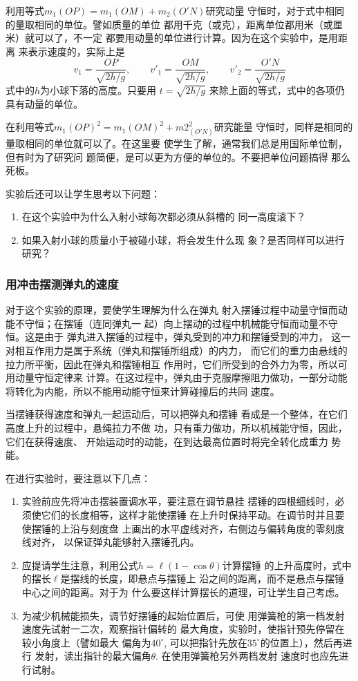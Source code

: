 利用等式$m_1(OP)=m_1(OM)+m_2(O'N)$研究动量
守恒时，对于式中相同的量取相同的单位。譬如质量的单位
都用千克（或克），距离单位都用米（或厘米）就可以了，不一定
都要用动量的单位进行计算。因为在这个实验中，是用距离
来表示速度的，实际上是
\[v_1=\frac{OP}{\sqrt{2h/g}},\qquad v'_1=\frac{OM}{\sqrt{2h/g}},\qquad v'_2=\frac{O'N}{\sqrt{2h/g}}\]
式中的$h$为小球下落的高度。只要用
$t=\sqrt{2h/g}$
来除上面的等式，式中的各项仍具有动量的单位。

在利用等式$m_1(OP)^2=m_1(OM)^2+m2_(O'N)^2$研究能量
守恒时，同样是相同的量取相同的单位就可以了。在这里要
使学生了解，通常我们总是用国际单位制，但有时为了研究问
题简便，是可以更为方便的单位的。不要把单位问题搞得
那么死板。

实验后还可以让学生思考以下问题：
\begin{enumerate}
\item 在这个实验中为什么入射小球每次都必须从斜槽的
同一高度滚下？
\item 如果入射小球的质量小于被碰小球，将会发生什么现
象？是否同样可以进行研究？
\end{enumerate}

\subsubsection{用冲击摆测弹丸的速度}

对于这个实验的原理，要使学生理解为什么在弹丸
射入摆锤过程中动量守恒而动能不守恒；在摆锤（连同弹丸一
起）向上摆动的过程中机械能守恒而动量不守恒。这是由于
弹丸进入摆锤的过程中，弹丸受到的冲力和摆锤受到的冲力，
这一对相互作用力是属于系统（弹丸和摆锤所组成）的内力，
而它们的重力由悬线的拉力所平衡，因此在弹丸和摆锤相互
作用时，它们所受到的合外力为零，所以可用动量守恒定律来
计算。在这过程中，弹丸由于克服摩擦阻力做功，一部分动能
将转化为内能，所以不能用动能守恒来计算碰撞后的共同
速度。

当摆锤获得速度和弹丸一起运动后，可以把弹丸和摆锤
看成是一个整体，在它们高度上升的过程中，悬绳拉力不做
功，只有重力做功，所以机械能守恒，因此，它们在获得速度、
开始运动时的动能，在到达最高位置时将完全转化成重力
势能。

在进行实验时，要注意以下几点：
\begin{enumerate}
\item 实验前应先将冲击摆装置调水平，要注意在调节悬挂
摆锤的四根细线时，必须使它们的长度相等，这样才能使摆锤
在上升时保持平动。在调节时并且要使摆锤的上沿与刻度盘
上画出的水平虚线对齐，右侧边与偏转角度的零刻度线对齐，
以保证弹丸能够射入摆锤孔内。
\item 应提请学生注意，利用公式$h=\ell(1-\cos\theta)$计算摆锤
的上升高度时，式中的摆长$\ell$是摆线的长度，即悬点与摆锤上
沿之间的距离，而不是悬点与摆锤中心之间的距离。对于为
什么要这样计算摆长的道理，可让学生自己考虑。
\item 为减少机械能损失，调节好摆锤的起始位置后，可使
用弹簧枪的第一档发射速度先试射一二次，观察指针偏转的
最大角度，实验时，使指针预先停留在较小角度上（譬如最大
偏角为$40^{\circ}$, 可以把指针先放在$35^{\circ}$的位置上），然后再进行
发射，读出指针的最大偏角$\theta$. 在使用弹簧枪另外两档发射
速度时也应先进行试射。
\end{enumerate}

